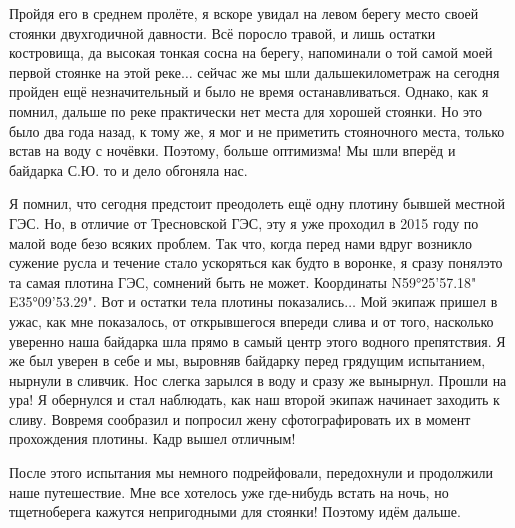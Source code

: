 Пройдя его в среднем пролёте, я вскоре увидал на левом берегу место своей стоянки двухгодичной давности. Всё поросло травой, и лишь остатки костровища, да высокая тонкая сосна на берегу, напоминали о той самой моей первой стоянке на этой реке$\ldots$ сейчас же мы шли дальше\mdash километраж на сегодня пройден ещё незначительный и было не время останавливаться. Однако, как я помнил, дальше по реке практически нет места для хорошей стоянки. Но это было два года назад, к тому же, я мог и не приметить стояночного места, только встав на воду с ночёвки. Поэтому, больше оптимизма! Мы шли вперёд и байдарка С.Ю. то и дело обгоняла нас. 

Я помнил, что сегодня предстоит преодолеть ещё одну плотину бывшей местной ГЭС. Но, в отличие от Тресновской ГЭС, эту я уже проходил в 2015 году по малой воде безо всяких проблем. Так что, когда перед нами вдруг возникло сужение русла и течение стало ускоряться как будто в воронке, я сразу понял\mdash это та самая плотина ГЭС, сомнений быть не может. Координаты N59°25'57.18" E35°09'53.29". Вот и остатки тела плотины показались$\ldots$ Мой экипаж пришел в ужас, как мне показалось, от открывшегося впереди слива и от того, насколько уверенно наша байдарка шла прямо в самый центр этого водного препятствия. Я же был уверен в себе и мы, выровняв байдарку перед грядущим испытанием, нырнули в сливчик. Нос слегка зарылся в воду и сразу же вынырнул. Прошли на ура! Я обернулся и стал наблюдать, как наш второй экипаж начинает заходить к сливу. Вовремя сообразил и попросил жену сфотографировать их в момент прохождения плотины. Кадр вышел отличным!

После этого испытания мы немного подрейфовали, передохнули и продолжили наше путешествие. Мне все хотелось уже где-нибудь встать на ночь, но тщетно\mdash берега кажутся непригодными для стоянки! Поэтому идём дальше.

